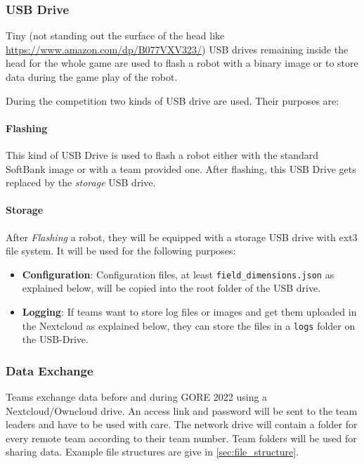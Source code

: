 \subsubsection{USB Drive}
\label{sec:c3_USB_Drive}
Tiny (not standing out the surface of the head like \url{https://www.amazon.com/dp/B077VXV323/}) USB drives remaining inside the head for the whole game are used to flash a robot with a binary image or to store data during the game play of the robot.

During the competition two kinds of USB drive are used. Their purposes are:

\paragraph*{Flashing}
This kind of USB Drive is used to flash a robot either with the standard SoftBank image or with a team provided one. After flashing, this USB Drive gets replaced by the \textit{storage} USB drive.

\paragraph*{Storage}
After \textit{Flashing} a robot, they will be equipped with a storage USB drive with ext3 file system. It will be used for the following purposes:

\begin{itemize}
	\item \textbf{Configuration}: Configuration files, at least \texttt{field\_dimensions.json} as explained below, will be copied into the root folder of the USB drive.
	\item  \textbf{Logging}: If teams want to store log files or images and get them uploaded in the Nextcloud as explained below, they can store the files in a \texttt{logs} folder on the USB-Drive.
\end{itemize}

\subsubsection{Data Exchange}
\label{sec:data_exchange}
Teams exchange data before and during GORE 2022 using a Nextcloud/Owncloud drive. An access link and password will be sent to the team leaders and have to be used with care. The network drive will contain a folder for every remote team according to their team number. Team folders will be used for sharing data. Example file structures are give in \ref{sec:file_structure}. 


